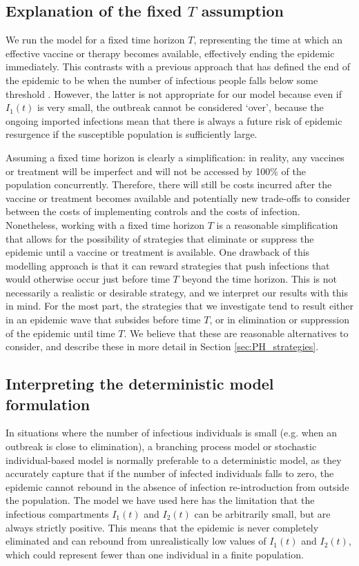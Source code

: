\documentclass[pdflatex]{sn-jnl}
\theoremstyle{thmstyleone}%
\theoremstyle{thmstyletwo}%
\theoremstyle{thmstylethree}%
\begin{document}
\subsection{Explanation of the fixed $T$ assumption}
We run the model for a fixed time horizon $T$, representing the time at which an effective vaccine or therapy becomes available, effectively ending the epidemic immediately. This contrasts with a previous approach that has defined the end of the epidemic to be when the number of infectious people falls below some threshold \citep{hansen_optimal_2011}. However, the latter is not appropriate for our model because even if $I_1(t)$ is very small, the outbreak cannot be considered `over', because the ongoing imported infections mean that there is always a future risk of epidemic resurgence if the susceptible population is sufficiently large. 

Assuming a fixed time horizon is clearly a simplification: in reality, any vaccines or treatment will be imperfect and will not be accessed by 100\% of the population concurrently. Therefore, there will still be costs incurred after the vaccine or treatment becomes available and potentially new trade-offs to consider between the costs of implementing controls and the costs of infection. Nonetheless, working with a fixed time horizon $T$ is a reasonable simplification that allows for the possibility of strategies that eliminate or suppress the epidemic until a vaccine or treatment is available. One drawback of this modelling approach is that it can reward strategies that push infections that would otherwise occur just before time $T$ beyond the time horizon. This is not necessarily a realistic or desirable strategy, and we interpret our results with this in mind. For the most part, the strategies that we investigate tend to result either in an epidemic wave that subsides before time $T$, or in elimination or suppression of the epidemic until time $T$. We believe that these are reasonable alternatives to consider, and describe these in more detail in Section \ref{sec:PH_strategies}.


\subsection{Interpreting the deterministic model formulation}

In situations where the number of infectious individuals is small (e.g. when an outbreak is close to elimination), a branching process model or stochastic individual-based model is normally preferable to a deterministic model, as they accurately capture that if the number of infected individuals falls to zero, the epidemic cannot rebound in the absence of infection re-introduction from outside the population. The model we have used here has the limitation that the infectious compartments $I_1(t)$ and $I_2(t)$ can be arbitrarily small, but are always strictly positive. This means that the epidemic is never completely eliminated and can rebound from unrealistically low values of $I_1(t)$ and $I_2(t)$, which could represent fewer than one individual in a finite population. 
\end{document}
